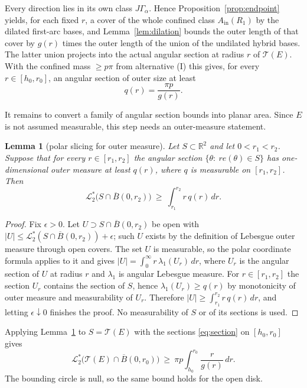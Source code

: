 \documentclass[11pt]{article}
\theoremstyle{plain}
\newtheorem{lemma}[theorem]{Lemma}
\theoremstyle{definition}
\theoremstyle{remark}
\newcommand{\R}{\mathbb{R}}
\newcommand{\Lout}{\mathcal{L}^{*}_{2}}
\newcommand{\Ain}{A_{\mathrm{in}}}
\newcommand{\Tri}{\mathcal{T}}
\begin{document}
Every direction lies in its own class $J\Gamma_{\alpha}$. Hence
Proposition~\ref{prop:endpoint} yields, for each fixed $r$, a cover of the whole
confined class $\Ain(R_{1})$ by the dilated first-arc bases, and
Lemma~\ref{lem:dilation} bounds the outer length of that cover by $g(r)$ times
the outer length of the union of the undilated hybrid bases. The latter union
projects into the actual angular section at radius $r$ of $\Tri(E)$.
With the confined mass $\ge p\pi$ from alternative (I) this gives, for every
$r\in[h_{0},r_{0}]$, an angular section of outer size at least
\begin{equation}\label{eq:section}
  q(r)=\frac{\pi p}{g(r)} .
\end{equation}

It remains to convert a family of angular section bounds into planar area. Since
$E$ is not assumed measurable, this step needs an outer-measure statement.

\begin{lemma}[polar slicing for outer measure]\label{lem:polar}
Let $S\subset\R^{2}$ and let $0<r_{1}<r_{2}$. Suppose that for every
$r\in[r_{1},r_{2}]$ the angular section
$\{\theta:\ r e(\theta)\in S\}$ has one-dimensional outer measure at least
$q(r)$, where $q$ is measurable on $[r_{1},r_{2}]$. Then
\[
  \Lout\bigl(S\cap\overline B(0,r_{2})\bigr)
  \ \ge\ \int_{r_{1}}^{r_{2}} r\,q(r)\,dr .
\]
\end{lemma}

\begin{proof}
Fix $\epsilon>0$. Let $U\supset S\cap\overline B(0,r_{2})$ be open with
$|U|\le\Lout(S\cap\overline B(0,r_{2}))+\epsilon$; such $U$ exists by the
definition of Lebesgue outer measure through open covers. The set $U$ is
measurable, so the polar coordinate formula applies to it and gives
$|U|=\int_{0}^{\infty}r\,\lambda_{1}(U_{r})\,dr$, where $U_{r}$ is the angular
section of $U$ at radius $r$ and $\lambda_{1}$ is angular Lebesgue measure. For
$r\in[r_{1},r_{2}]$ the section $U_{r}$ contains the section of $S$, hence
$\lambda_{1}(U_{r})\ge q(r)$ by monotonicity of outer measure and measurability
of $U_{r}$. Therefore
$|U|\ge\int_{r_{1}}^{r_{2}}r\,q(r)\,dr$, and letting $\epsilon\downarrow0$
finishes the proof. No measurability of $S$ or of its sections is used.
\end{proof}

Applying Lemma~\ref{lem:polar} to $S=\Tri(E)$ with the sections
\eqref{eq:section} on $[h_{0},r_{0}]$ gives
\begin{equation}\label{eq:radialint}
  \Lout\bigl(\Tri(E)\cap \overline B(0,r_{0})\bigr)
  \ \ge\ \pi p\int_{h_{0}}^{r_{0}}\frac{r}{g(r)}\,dr .
\end{equation}
The bounding circle is null, so the same bound holds for the open disk.
\end{document}
